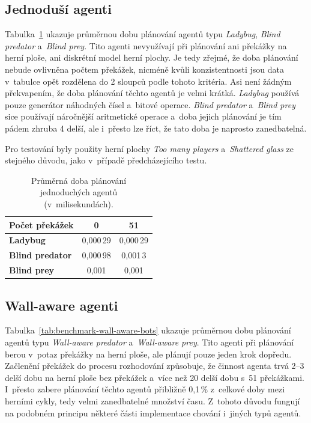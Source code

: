 \subsection*{Jednoduší agenti}

Tabulka~\ref{tab:benchmark-simple-bots} ukazuje průměrnou dobu plánování agentů typu \emph{Ladybug}, \emph{Blind predator} a~\emph{Blind prey}. Tito agenti nevyužívají při plánování ani překážky na herní ploše, ani diskrétní model herní plochy. Je tedy zřejmé, že doba plánování nebude ovlivněna počtem překážek, nicméně kvůli konzistentnosti jsou data v~tabulce opět rozdělena do 2 sloupců podle tohoto kritéria. Asi není žádným překvapením, že doba plánování těchto agentů je velmi krátká. \emph{Ladybug} používá pouze generátor náhodných čísel a~bitové operace. \emph{Blind predator} a~\emph{Blind prey} sice používají náročnější aritmetické operace a~doba jejich plánování je tím pádem zhruba 4\texttimes{} delší, ale i~přesto lze říct, že tato doba je naprosto zanedbatelná.

Pro testování byly použity herní plochy \emph{Too many players} a~\emph{Shattered glass} ze stejného důvodu, jako v~případě předcházejícího testu.

\begin{table}[ht]
    \centering
    \begin{tabular}{|l|c|c|} \hline
        \textbf{Počet překážek} & \textbf{0}  & \textbf{51} \\ \hline\hline
        \textbf{Ladybug}        & 0,000\,29   & 0,000\,29   \\ \hline
        \textbf{Blind predator} & 0,000\,98   & 0,001\,3    \\ \hline
        \textbf{Blind prey}     & 0,001       & 0,001       \\ \hline
    \end{tabular}
    \caption{Průměrná doba plánování jednoduchých agentů (v~milisekundách).}
    \label{tab:benchmark-simple-bots}
\end{table}

\subsection*{Wall-aware agenti}

Tabulka~\ref{tab:benchmark-wall-aware-bots} ukazuje průměrnou dobu plánování agentů typu \emph{Wall-aware predator} a~\emph{Wall-aware prey}. Tito agenti při plánování berou v~potaz překážky na herní ploše, ale plánují pouze jeden krok dopředu. Začlenění překážek do procesu rozhodování způsobuje, že činnost agenta trvá 2--3\texttimes{} delší dobu na herní ploše bez překážek a~více než 20\texttimes{} delší dobu s~51 překážkami. I~přesto zabere plánování těchto agentů přibližně 0,1\,\% z~celkové doby mezi herními cykly, tedy velmi zanedbatelné množství času. Z~tohoto důvodu fungují na podobném principu některé části implementace chování i~jiných typů agentů.

